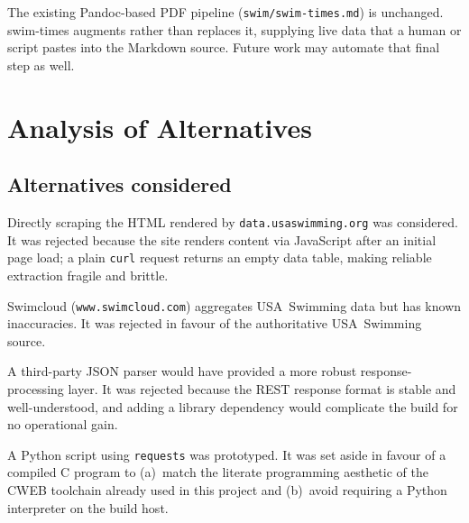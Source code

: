 \documentclass[12pt]{article}
\newcommand{\code}[1]{\texttt{#1}}
\begin{document}
The existing Pandoc-based PDF pipeline (\code{swim/swim-times.md})
is unchanged.  swim-times augments rather than replaces it,
supplying live data that a human or script pastes into the Markdown
source.  Future work may automate that final step as well.

\section{Analysis of Alternatives}

\subsection{Alternatives considered}

\begin{description}[style=nextline]
  \item[Web scraping via \code{curl}/HTML parsing.]
        Directly scraping the HTML rendered by
        \texttt{data.usaswimming.org} was considered.  It was
        rejected because the site renders content via JavaScript
        after an initial page load; a plain \code{curl} request
        returns an empty data table, making reliable extraction
        fragile and brittle.

  \item[Swimcloud API.]
        Swimcloud (\texttt{www.swimcloud.com}) aggregates
        USA~Swimming data but has known inaccuracies.  It was
        rejected in favour of the authoritative USA~Swimming source.

  \item[Full JSON parsing library (e.g., \code{cJSON}, \code{jansson}).]
        A third-party JSON parser would have provided a more robust
        response-processing layer.  It was rejected because the
        REST response format is stable and well-understood,
        and adding a library dependency would complicate the build
        for no operational gain.

  \item[Python or shell script.]
        A Python script using \code{requests} was prototyped.
        It was set aside in favour of a compiled C program to
        (a)~match the literate programming aesthetic of the
        CWEB toolchain already used in this project and
        (b)~avoid requiring a Python interpreter on the build host.
\end{description}
\end{document}
